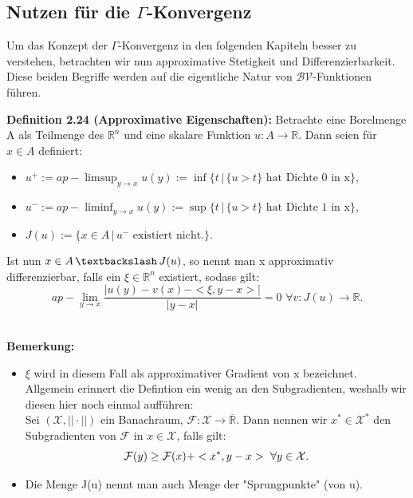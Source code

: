 \subsection[Nutzen für die Gamma-Konvergenz]{Nutzen für die \(\Gamma\)-Konvergenz}{\label{subsec:gammabvuse}}
Um das Konzept der \(\Gamma\)-Konvergenz in den folgenden Kapiteln besser zu verstehen, betrachten wir nun approximative Stetigkeit und Differenzierbarkeit. Diese beiden Begriffe werden auf die eigentliche Natur von \(\mathcal{BV}\)-Funktionen führen.\\[0.5cm]
\colorbox{generalYellow}{\begin{minipage}{16cm}{\textcolor{black}{}{\label{def2.24}}}
\textbf{Definition 2.24 (Approximative Eigenschaften):} Betrachte eine Borelmenge A als Teilmenge des \(\mathbb{R}^n\) und eine skalare Funktion \(u:A \to \mathbb{R}\). Dann seien für \(x \in A\) definiert:
\begin{itemize}
    \item \(u^+ := ap-\limsup_{y \to x} u(y) := \inf \{t \, | \, \{u > t\} \text{ hat Dichte 0 in x}\}\),
    \item \(u^- := ap-\liminf_{y \to x} u(y) := \sup \{t \, | \, \{u > t\} \text{ hat Dichte 1 in x}\}\),
    \item \(J(u) := \{x \in A \, | \, u^- \text{ existiert nicht.}\}\).
\end{itemize}
Ist nun \(x \in A \, \textbackslash \, J(u)\), so nennt man x approximativ differenzierbar, falls ein \(\xi \in \mathbb{R}^n\) existiert, sodass gilt:
\begin{equation}
    ap-\lim_{y \to x} \frac{|u(y) - v(x) - <\xi,y-x>|}{|y-x|} = 0 \, \, \forall v:J(u) \to \mathbb{R}.
\end{equation}
\end{minipage}}\\

\textbf{Bemerkung:} \begin{itemize}
    \item \(\xi\) wird in diesem Fall als approximativer Gradient von x bezeichnet. Allgemein erinnert die Defintion ein wenig an den Subgradienten, weshalb wir diesen hier noch einmal aufführen:\\
    Sei \((\mathcal{X},||\cdot||)\) ein Banachraum, \(\mathcal{F}:\mathcal{X} \to \overline{\mathbb{R}}\). Dann nennen wir \(x^* \in \mathcal{X}^*\) den Subgradienten von \(\mathcal{F}\) in \(x \in \mathcal{X}\), falls  gilt:
    \begin{equation}{\label{eq.2.31}}
        \mathcal{F}(y) \geq \mathcal{F}(x) + <x^*,y-x> \, \, \forall y \in \mathcal{X}.
    \end{equation}
    \item Die Menge J(u) nennt man auch Menge der "Sprungpunkte" (von u).
\end{itemize}

